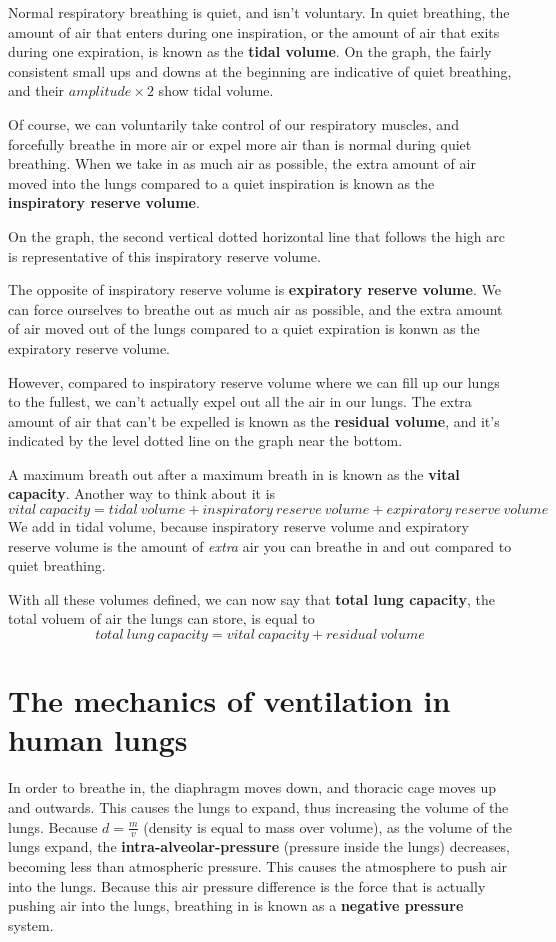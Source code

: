 \documentclass[index]{subfiles}
\begin{document}
Normal respiratory breathing is quiet, and isn't voluntary. In quiet breathing, the amount of air that enters during one inspiration, or the amount of air that exits during one expiration, is known as the \textbf{tidal volume}. On the graph, the fairly consistent small ups and downs at the beginning are indicative of quiet breathing, and their \(amplitude\times 2\) show tidal volume.

Of course, we can voluntarily take control of our respiratory muscles, and forcefully breathe in more air or expel more air than is normal during quiet breathing. When we take in as much air as possible, the extra amount of air moved into the lungs compared to a quiet inspiration is known as the \textbf{inspiratory reserve volume}.

On the graph, the second vertical dotted horizontal line that follows the high arc is representative of this inspiratory reserve volume.

The opposite of inspiratory reserve volume is \textbf{expiratory reserve volume}. We can force ourselves to breathe out as much air as possible, and the extra amount of air moved out of the lungs compared to a quiet expiration is konwn as the expiratory reserve volume.

However, compared to inspiratory reserve volume where we can fill up our lungs to the fullest, we can't actually expel out all the air in our lungs. The extra amount of air that can't be expelled is known as the \textbf{residual volume}, and it's indicated by the level dotted line on the graph near the bottom.

A maximum breath out after a maximum breath in is known as the \textbf{vital capacity}. Another way to think about it is
\[
    vital\ capacity = tidal\ volume + inspiratory\ reserve\ volume +expiratory\ reserve\ volume
\]
We add in tidal volume, because inspiratory reserve volume and expiratory reserve volume is the amount of \textit{extra} air you can breathe in and out compared to quiet breathing.

With all these volumes defined, we can now say that \textbf{total lung capacity}, the total voluem of air the lungs can store,  is equal to
\[
    total\ lung\ capacity = vital\ capacity + residual\ volume
\]

\section{The mechanics of ventilation in human lungs}

In order to breathe in, the diaphragm moves down, and thoracic cage moves up and outwards. This causes the lungs to expand, thus increasing the volume of the lungs. Because \(d=\frac{m}{v}\) (density is equal to mass over volume), as the volume of the lungs expand, the \textbf{intra-alveolar-pressure} (pressure inside the lungs) decreases, becoming less than atmospheric pressure. This causes the atmosphere to push air into the lungs. Because this air pressure difference is the force that is actually pushing air into the lungs, breathing in is known as a \textbf{negative pressure} system.
\end{document}
